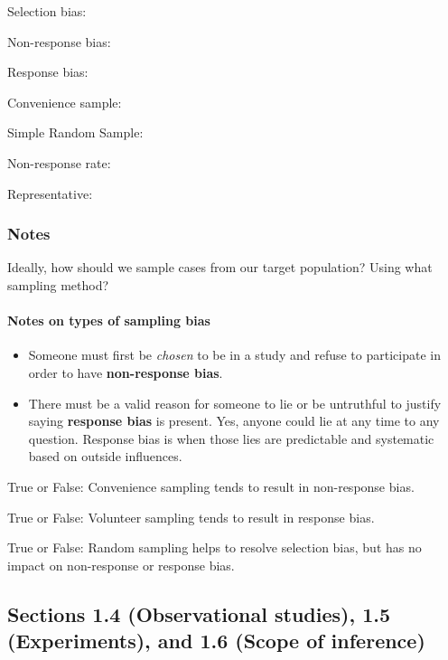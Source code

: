 \documentclass[
]{report}
\newcommand{\rgs}{\vspace{12pt}} %
\newcommand{\rgi}{\hspace{24pt}}  %
\begin{document}
\rgi Selection bias:
\rgs

\rgi Non-response bias:
\rgs

\rgi Response bias:
\rgs

Convenience sample:
\rgs

Simple Random Sample:
\rgs

Non-response rate:
\rgs

Representative:
\rgs

\hypertarget{notes-1}{%
\subsubsection*{Notes}\label{notes-1}}

Ideally, how should we sample cases from our target population? Using what sampling method?
\rgs

\hypertarget{notes-on-types-of-sampling-bias}{%
\paragraph*{Notes on types of sampling bias}\label{notes-on-types-of-sampling-bias}}

\begin{itemize}
\item
  Someone must first be \emph{chosen} to be in a study and refuse to participate in order to have \textbf{non-response bias}.
\item
  There must be a valid reason for someone to lie or be untruthful to justify saying \textbf{response bias} is present. Yes, anyone could lie at any time to any question. Response bias is when those lies are predictable and systematic based on outside influences.
  \rgs
\end{itemize}

True or False: Convenience sampling tends to result in non-response bias.

True or False: Volunteer sampling tends to result in response bias.

True or False: Random sampling helps to resolve selection bias, but has no impact on non-response or response bias.

\hypertarget{sections-1.4-observational-studies-1.5-experiments-and-1.6-scope-of-inference}{%
\subsection*{Sections 1.4 (Observational studies), 1.5 (Experiments), and 1.6 (Scope of inference)}\label{sections-1.4-observational-studies-1.5-experiments-and-1.6-scope-of-inference}}
\end{document}
